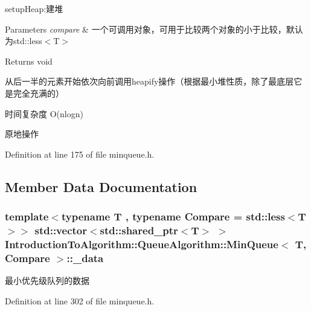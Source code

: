 setup\+Heap\+:建堆 


\begin{DoxyParams}{Parameters}
{\em compare} & 一个可调用对象，可用于比较两个对象的小于比较，默认为std\+::less$<$\+T$>$ \\
\hline
\end{DoxyParams}
\begin{DoxyReturn}{Returns}
void
\end{DoxyReturn}
从后一半的元素开始依次向前调用heapify操作（根据最小堆性质，除了最底层它是完全充满的）


\begin{DoxyItemize}
\item 时间复杂度 O(nlogn)
\item 原地操作 
\end{DoxyItemize}

Definition at line 175 of file minqueue.\+h.



\subsection{Member Data Documentation}
\hypertarget{class_introduction_to_algorithm_1_1_queue_algorithm_1_1_min_queue_aa5036c59645d1f17dfd5efc5760b7dd4}{}
\subsubsection[{\+\_\+data}]{\setlength{\rightskip}{0pt plus 5cm}template$<$typename T , typename Compare  = std\+::less$<$\+T$>$$>$ std\+::vector$<$std\+::shared\+\_\+ptr$<$T$>$ $>$ {\bf Introduction\+To\+Algorithm\+::\+Queue\+Algorithm\+::\+Min\+Queue}$<$ T, Compare $>$\+::\+\_\+data\hspace{0.3cm}{\ttfamily [private]}}\label{class_introduction_to_algorithm_1_1_queue_algorithm_1_1_min_queue_aa5036c59645d1f17dfd5efc5760b7dd4}
最小优先级队列的数据 

Definition at line 302 of file minqueue.\+h.

\hypertarget{class_introduction_to_algorithm_1_1_queue_algorithm_1_1_min_queue_a6a4c6fb635e4c827d5511e1f6ac1ff67}{}
